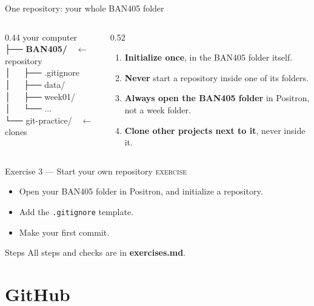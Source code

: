 \documentclass[aspectratio=169,11pt]{beamer}
\newcommand{\code}[1]{\texttt{#1}}
\newcommand{\key}[1]{\textbf{\textcolor{ban}{#1}}}
\newcommand{\exerciseframe}[3]{%
  \begin{frame}[t]{#1}
    \vspace{0.4em}
    {\small\textcolor{softgray}{\textsc{exercise}}}\par\vspace{0.6em}
    #2
    \vfill
    \begin{block}{Steps}
      All steps and checks are in \key{exercises.md}. #3
    \end{block}
    \vspace{0.6em}
  \end{frame}}
\begin{document}
\begin{frame}{One repository: your whole BAN405 folder}
  \begin{columns}[T]
    \begin{column}{0.44\textwidth}
      \ttfamily\small
      \textcolor{softgray}{your computer}\\
      ├── \textbf{BAN405/}\ \ \textcolor{ban}{$\leftarrow$ repository}\\
      │\ \ \ ├── .gitignore\\
      │\ \ \ ├── data/\\
      │\ \ \ ├── week01/\\
      │\ \ \ └── ...\\
      └── git-practice/\ \ \textcolor{ban}{$\leftarrow$ clones}
    \end{column}
    \begin{column}{0.52\textwidth}
      \begin{enumerate}
        \item \textbf{Initialize once}, in the BAN405 folder itself.
        \item \textbf{Never} start a repository inside one of its folders.
        \item \textbf{Always open the BAN405 folder} in Positron, not a week folder.
        \item \textbf{Clone other projects next to it}, never inside it.
      \end{enumerate}
    \end{column}
  \end{columns}
\end{frame}

\exerciseframe{Exercise 3 --- Start your own repository}{%
  \begin{itemize}
    \item Open your BAN405 folder in Positron, and initialize a repository.
    \item Add the \code{.gitignore} template.
    \item Make your first commit.
  \end{itemize}}{}

\section{GitHub}
\end{document}
